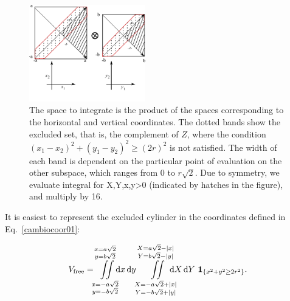\documentclass[superscriptaddress,pre,reprint,showpacs,twocolumn]{revtex4-1}
\newcommand{\rd}[1]{\mathrm{d}{#1} \,}
\newcommand{\indicatorsymbol}{\mathbf{1}}
\newcommand{\indicator}[1]{\indicatorsymbol_{ \{   #1 \} } }
\begin{document}
\begin{figure}[h]
  \begin{center}
    \includegraphics[width=0.45\textwidth]{figures/diagramintegra01.pdf}
  \end{center}
  \caption{The space to integrate is the product of the spaces
    corresponding to the horizontal and vertical coordinates. The dotted
    bands show the excluded set, that is, the complement of $Z$, where the condition 
    $ (x_1-x_2)^2 + (y_1-y_2)^2 \ge (2r)^2 $ is not satisfied.
    The width of each band is dependent on the particular 
    point of evaluation
    on the other subspace, which ranges from 0 to $r\sqrt{2}$. Due to symmetry, 
    we evaluate integral for X,Y,x,y>0 (indicated by hatches in the
    figure), and multiply by 16.
    \label{diagintegral01}  
    }
\end{figure}

It is easiest to represent the  
excluded cylinder in the coordinates defined in 
Eq.~\eqref{cambiocoor01}:

\begin{equation}\label{integraltotal}
  V_\text{free} = 
  \iint\limits_{\substack{ x=-a \sqrt{2} \\ y=-b \sqrt{2}}}
  ^{\substack{ x=a \sqrt{2} \\ y=b \sqrt{2}}}
   \mkern-9mu \rd x \rd y 
  \iint \limits_{\substack{X=-a\sqrt{2} + |x| \\ Y=-b \sqrt{2} + |y| }}^
  {\substack{X=a\sqrt{2} - |x| \\ Y=b \sqrt{2} - |y| }}
   \mkern-18mu  \rd X \rd Y
\, \indicator{ x^2 + y^2 \ge 2r^2  }.
\end{equation}
\end{document}
